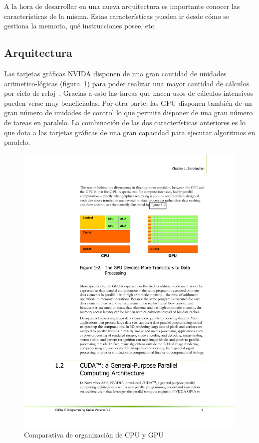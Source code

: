 A la hora de desarrollar en una nueva arquitectura es importante conocer las características de la misma. Estas características pueden ir desde cómo se gestiona la memoria, qué instrucciones posee, etc.

\subsection{Arquitectura}

Las tarjetas gráficas NVIDA disponen de una gran cantidad de unidades aritmetico-lógicas (figura~\ref{fig:cudaorggpu}) para poder realizar una mayor cantidad de cálculos por ciclo de reloj~\cite{nvidia:cuda_c_programming_guide}. Gracias a esto las tareas que hacen usos de cálculos intensivos pueden verse muy beneficiadas. Por otra parte, las GPU disponen también de un gran número de unidades de control lo que permite disponer de una gran número de tareas en paralelo. La combinación de las dos características anteriores es lo que dota a las tarjetas gráficas de una gran capacidad para ejecutar algoritmos en paralelo.

\begin{figure}
	\centering
	\includegraphics[width=1\textwidth]{images/cpuvsgpu.pdf}
	\caption{Comparativa de organización de CPU y GPU \cite{nvidia:cuda_c_programming_guide}}\label{fig:cudaorggpu}
\end{figure}

